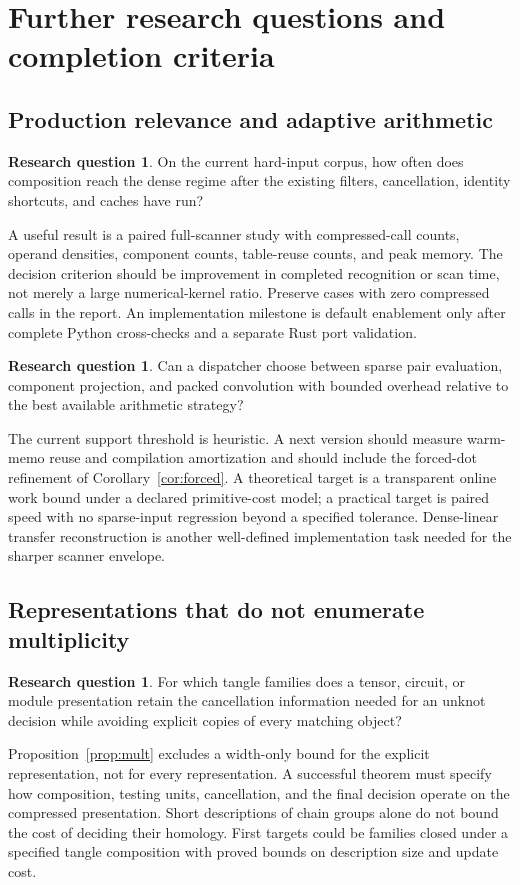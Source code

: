 \documentclass[11pt,letterpaper]{article}
\theoremstyle{definition}
\newtheorem{question}[theorem]{Research question}
\theoremstyle{remark}
\begin{document}
\section{Further research questions and completion criteria}
\label{sec:research}
\subsection{Production relevance and adaptive arithmetic}
\begin{question}
On the current hard-input corpus, how often does composition reach the
dense regime after the existing filters, cancellation, identity shortcuts,
and caches have run?
\end{question}
A useful result is a paired full-scanner study with compressed-call counts,
operand densities, component counts, table-reuse counts, and peak memory.
The decision criterion should be improvement in completed recognition or
scan time, not merely a large numerical-kernel ratio. Preserve cases with
zero compressed calls in the report. An implementation milestone is default
enablement only after complete Python cross-checks and a separate Rust
port validation.

\begin{question}
Can a dispatcher choose between sparse pair evaluation, component
projection, and packed convolution with bounded overhead relative to the
best available arithmetic strategy?
\end{question}
The current support threshold is heuristic. A next version should measure
warm-memo reuse and compilation amortization and should include the
forced-dot refinement of Corollary~\ref{cor:forced}. A theoretical target
is a transparent online work bound under a declared primitive-cost model;
a practical target is paired speed with no sparse-input regression beyond
a specified tolerance. Dense-linear transfer reconstruction is another
well-defined implementation task needed for the sharper scanner envelope.

\subsection{Representations that do not enumerate multiplicity}
\begin{question}
For which tangle families does a tensor, circuit, or module presentation
retain the cancellation information needed for an unknot decision while
avoiding explicit copies of every matching object?
\end{question}
Proposition~\ref{prop:mult} excludes a width-only bound for the explicit
representation, not for every representation. A successful theorem must
specify how composition, testing units, cancellation, and the final decision
operate on the compressed presentation. Short descriptions of chain groups
alone do not bound the cost of deciding their homology. First targets could
be families closed under a specified tangle composition with proved bounds
on description size and update cost.
\end{document}

